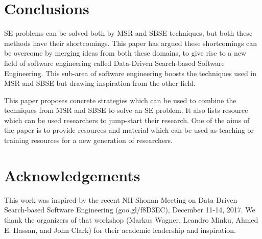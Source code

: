 \documentclass[sigconf,anonymous,review]{acmart}
\begin{document}
\section{Conclusions}
SE problems can be solved both by MSR and SBSE techniques, but both these methods have their shortcomings. This paper has argued these shortcomings can be overcome by merging ideas from both these domains, to give rise to a new field of software engineering called Data-Driven Search-based Software Engineering. This sub-area of software engineering boosts the techniques used in MSR and SBSE but drawing inspiration from the other field. 

This paper proposes concrete strategies which can be used to combine the techniques from MSR and SBSE to solve an SE problem. It also lists resource which can be used researchers to jump-start their research. One of the aims of the paper is to provide resources and material which can be used as teaching or training resources for a new generation of researchers. 

% 
% 

\section*{Acknowledgements}
This work was inspired by the recent
 NII Shonan Meeting on Data-Driven Search-based Software Engineering (goo.gl/f8D3EC), December 11-14, 2017.
We thank the organizers of that workshop 
(Markus Wagner,  
 Leandro Minku,  
 Ahmed E. Hassan, and 
 John Clark)
for their academic
leadership and inspiration.

 

 
\end{document}
